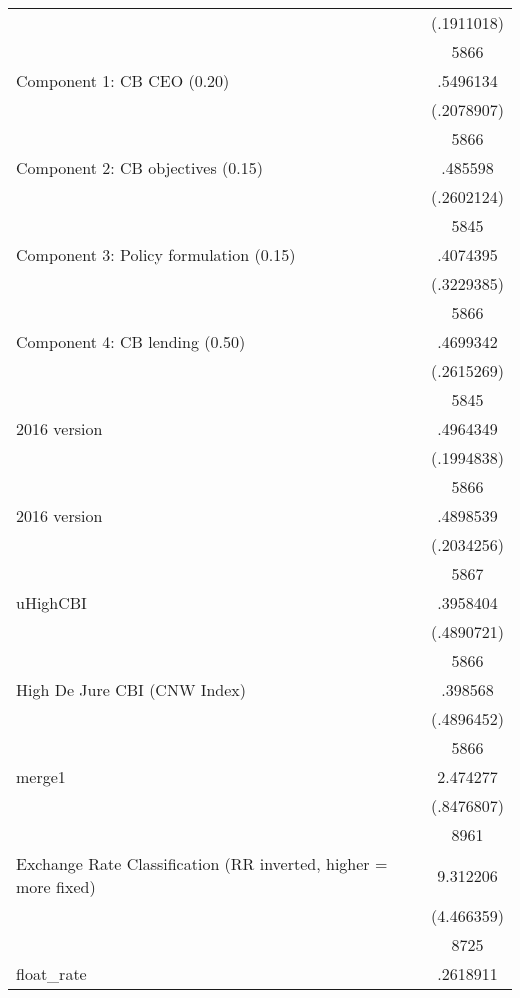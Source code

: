 {\begin{longtable}{l*{1}{c}}
                    &  (.1911018)\\
                    &        5866\\
Component 1: CB CEO (0.20)&    .5496134\\
                    &  (.2078907)\\
                    &        5866\\
Component 2: CB objectives (0.15)&     .485598\\
                    &  (.2602124)\\
                    &        5845\\
Component 3: Policy formulation (0.15)&    .4074395\\
                    &  (.3229385)\\
                    &        5866\\
Component 4: CB lending (0.50)&    .4699342\\
                    &  (.2615269)\\
                    &        5845\\
2016 version        &    .4964349\\
                    &  (.1994838)\\
                    &        5866\\
2016 version        &    .4898539\\
                    &  (.2034256)\\
                    &        5867\\
uHighCBI            &    .3958404\\
                    &  (.4890721)\\
                    &        5866\\
High De Jure CBI (CNW Index)&     .398568\\
                    &  (.4896452)\\
                    &        5866\\
merge1              &    2.474277\\
                    &  (.8476807)\\
                    &        8961\\
Exchange Rate Classification (RR inverted, higher = more fixed)&    9.312206\\
                    &  (4.466359)\\
                    &        8725\\
float\_rate          &    .2618911\\

\end{longtable}}
